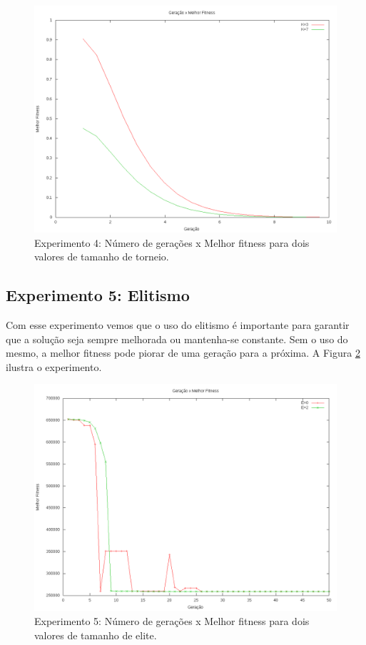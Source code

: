 \documentclass[12pt]{article}
\begin{document}
\begin{figure}[ht]
  \centering
  \includegraphics[width=1\textwidth]{exp4k7.png}
  \caption{Experimento 4: Número de gerações x Melhor fitness para dois valores de tamanho de torneio.}
  \label{fig:exp4k7}
\end{figure}

\subsection{Experimento 5: Elitismo}

Com esse experimento vemos que o uso do elitismo é importante para garantir que a solução seja sempre
melhorada ou mantenha-se constante. Sem o uso do mesmo, a melhor fitness pode piorar de uma geração
para a próxima. A Figura \ref{fig:exp5h} ilustra o experimento.

\begin{figure}[ht]
  \centering
  \includegraphics[width=1\textwidth]{exp5h.png}
  \caption{Experimento 5: Número de gerações x Melhor fitness para dois valores de tamanho de elite.}
  \label{fig:exp5h}
\end{figure}
\end{document}
